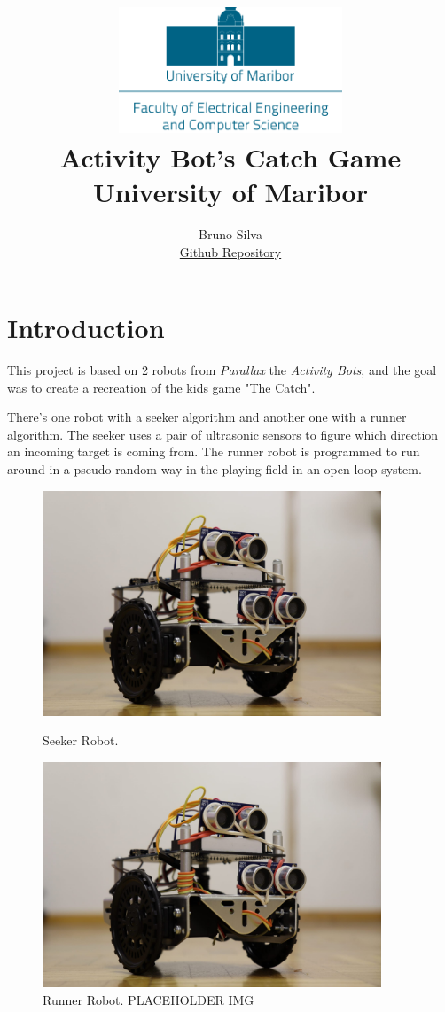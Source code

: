 \documentclass{report}
\title{
\includegraphics[width=0.5\textwidth]{resources/feri_logo.png} \\
Activity Bot's Catch Game\\
\Large{University of Maribor}
}
\author{Bruno Silva\\
      \href{https://github.com/brunofavs/propeller_cath_game}{Github Repository}
      }
\begin{document}
\maketitle

\tableofcontents
\listoffigures
\pagebreak

\section{Introduction}

This project is based on 2 robots from \textit{Parallax} the \textit{Activity
Bots}, and the goal was to create a recreation of the kids game "The Catch".

There's one robot with a seeker algorithm and another one with a runner
algorithm. The seeker uses a pair of ultrasonic sensors to figure which
direction an incoming target is coming from. The runner robot is programmed to
run around in a pseudo-random way in the playing field in an open loop system.

\begin{figure}[h]
    \centering
    \begin{minipage}{0.45\textwidth}
        \centering
        \includegraphics[width=0.9\textwidth]{resources/Seeker_robot/4.jpeg} %
      \caption{\label{fig:Seeker}Seeker Robot.}
    \end{minipage}\hfill
    \begin{minipage}{0.45\textwidth}
        \centering
        \includegraphics[width=0.9\textwidth]{resources/Seeker_robot/4.jpeg} %
      \caption{\label{fig:Runner}Runner Robot. PLACEHOLDER IMG}
    \end{minipage}
\end{figure}
\end{document}
